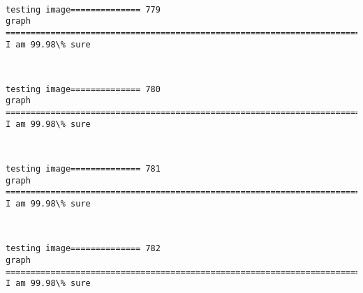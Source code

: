 \documentclass[11pt]{article}
\begin{document}
    \begin{center}
    \end{center}
    { \hspace*{\fill} \\}
    
    \begin{Verbatim}[commandchars=\\\{\}]
testing image============== 779
graph
============================================================================
I am 99.98\% sure

    \end{Verbatim}

    \begin{center}
    \end{center}
    { \hspace*{\fill} \\}
    
    \begin{Verbatim}[commandchars=\\\{\}]
testing image============== 780
graph
============================================================================
I am 99.98\% sure

    \end{Verbatim}

    \begin{center}
    \end{center}
    { \hspace*{\fill} \\}
    
    \begin{Verbatim}[commandchars=\\\{\}]
testing image============== 781
graph
============================================================================
I am 99.98\% sure

    \end{Verbatim}

    \begin{center}
    \end{center}
    { \hspace*{\fill} \\}
    
    \begin{Verbatim}[commandchars=\\\{\}]
testing image============== 782
graph
============================================================================
I am 99.98\% sure

    \end{Verbatim}
\end{document}

